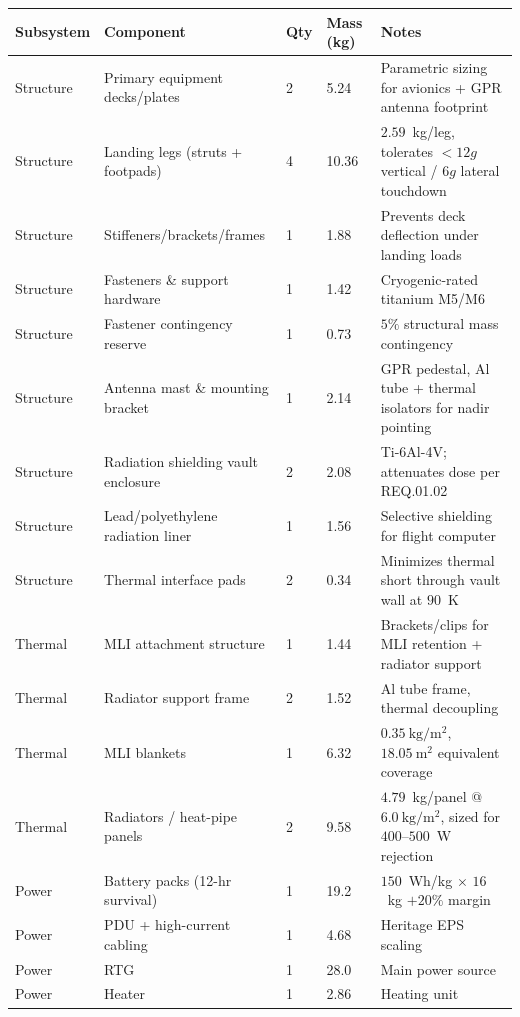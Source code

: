 \documentclass[11pt]{article}
\begin{document}
\begin{table}[H]
\centering
\footnotesize
\begin{tabular}{p{1.7cm}p{4.3cm}p{0.5cm}p{1.2cm}p{5.5cm}}
\toprule
\textbf{Subsystem} & \textbf{Component} & \textbf{Qty} & \textbf{Mass (kg)} & \textbf{Notes} \\
\midrule
Structure & Primary equipment decks/plates & 2 & 5.24 & Parametric sizing for avionics + GPR
antenna footprint \\
Structure & Landing legs (struts + footpads) & 4 & 10.36 & $2.59$~kg/leg, tolerates $<12g$
vertical / $6g$ lateral touchdown \\
Structure & Stiffeners/brackets/frames & 1 & 1.88 & Prevents deck deflection under landing loads \\
Structure & Fasteners \& support hardware & 1 & 1.42 & Cryogenic-rated titanium M5/M6 \\
Structure & Fastener contingency reserve & 1 & 0.73 & $5\%$ structural mass contingency \\
Structure & Antenna mast \& mounting bracket & 1 & 2.14 & GPR pedestal, Al tube + thermal
isolators for nadir pointing \\
Structure & Radiation shielding vault enclosure & 2 & 2.08 & Ti-6Al-4V; attenuates dose per
REQ.01.02 \\
Structure & Lead/polyethylene radiation liner & 1 & 1.56 & Selective shielding for flight
computer \\
Structure & Thermal interface pads & 2 & 0.34 & Minimizes thermal short through vault wall at
$90$~K \\
Thermal & MLI attachment structure & 1 & 1.44 & Brackets/clips for MLI retention + radiator
support \\
Thermal & Radiator support frame & 2 & 1.52 & Al tube frame, thermal decoupling \\
Thermal & MLI blankets & 1 & 6.32 & $0.35\ \mathrm{kg/m^2}$, $18.05\ \mathrm{m^2}$ equivalent
coverage \\
Thermal & Radiators / heat-pipe panels & 2 & 9.58 & $4.79$~kg/panel @ $6.0\ \mathrm{kg/m^2}$,
sized for $400$--$500$~W rejection \\
Power & Battery packs (12-hr survival) & 1 & 19.2 & $150$~Wh/kg $\times$ $16$~kg $+20\%$ margin \\
Power & PDU + high-current cabling & 1 & 4.68 & Heritage EPS scaling \\
Power & RTG & 1 & 28.0 & Main power source \\
Power & Heater & 1 & 2.86 & Heating unit \\

\end{tabular}
\end{table}
\end{document}
